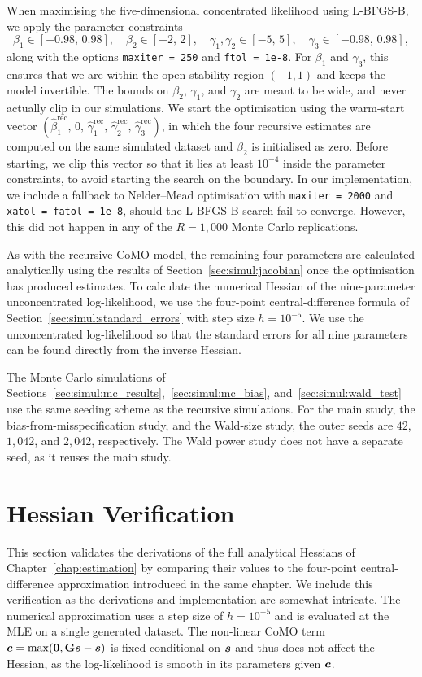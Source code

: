 When maximising the five-dimensional concentrated likelihood using L-BFGS-B, we apply the parameter constraints
\[
    \beta_1 \in [-0.98,\, 0.98],\quad
    \beta_2 \in [-2,\, 2],\quad
    \gamma_1, \gamma_2 \in [-5,\, 5],\quad
    \gamma_3 \in [-0.98,\, 0.98],
\]
along with the options \texttt{maxiter = 250} and \texttt{ftol = 1e-8}. For $\beta_1$ and $\gamma_3$, this ensures that we are within the open stability region $(-1, 1)$ and keeps the model invertible. The bounds on $\beta_2$, $\gamma_1$, and $\gamma_2$ are meant to be wide, and never actually clip in our simulations. We start the optimisation using the warm-start vector $(\hat{\beta}_1^{\text{rec}},\, 0,\, \hat{\gamma}_1^{\text{rec}},\, \hat{\gamma}_2^{\text{rec}},\, \hat{\gamma}_3^{\text{rec}})$, in which the four recursive estimates are computed on the same simulated dataset and $\beta_2$ is initialised as zero. Before starting, we clip this vector so that it lies at least $10^{-4}$ inside the parameter constraints, to avoid starting the search on the boundary. In our implementation, we include a fallback to Nelder--Mead optimisation with \texttt{maxiter = 2000} and \texttt{xatol = fatol = 1e-8}, should the L-BFGS-B search fail to converge. However, this did not happen in any of the $R = 1{,}000$ Monte Carlo replications.

As with the recursive CoMO model, the remaining four parameters are calculated analytically using the results of Section~\ref{sec:simul:jacobian} once the optimisation has produced estimates. To calculate the numerical Hessian of the nine-parameter unconcentrated log-likelihood, we use the four-point central-difference formula of Section~\ref{sec:simul:standard_errors} with step size $h = 10^{-5}$. We use the unconcentrated log-likelihood so that the standard errors for all nine parameters can be found directly from the inverse Hessian.

The Monte Carlo simulations of Sections~\ref{sec:simul:mc_results},~\ref{sec:simul:mc_bias}, and~\ref{sec:simul:wald_test} use the same seeding scheme as the recursive simulations. For the main study, the bias-from-misspecification study, and the Wald-size study, the outer seeds are $42$, $1{,}042$, and $2{,}042$, respectively. The Wald power study does not have a separate seed, as it reuses the main study.

\section{Hessian Verification}
\label{app:code:hessian}
This section validates the derivations of the full analytical Hessians of Chapter~\ref{chap:estimation} by comparing their values to the four-point central-difference approximation introduced in the same chapter. We include this verification as the derivations and implementation are somewhat intricate. The numerical approximation uses a step size of $h = 10^{-5}$ and is evaluated at the MLE on a single generated dataset. The non-linear CoMO term $\bm{c} = \max(\bm{0}, \mathbf{G}\bm{s} - \bm{s})$ is fixed conditional on $\bm{s}$ and thus does not affect the Hessian, as the log-likelihood is smooth in its parameters given $\bm{c}$.


